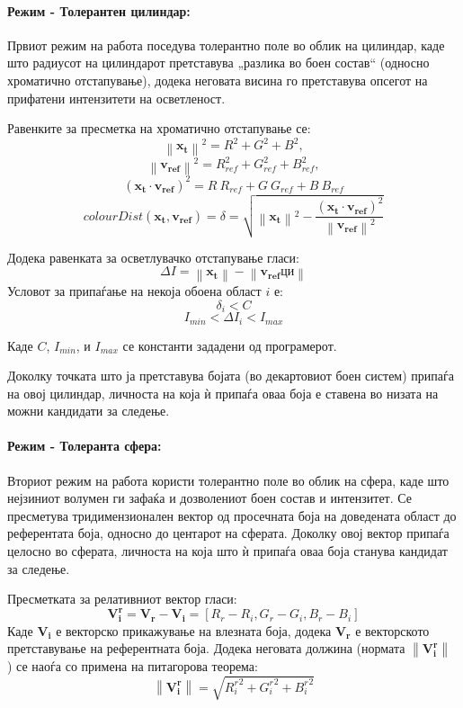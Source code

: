 \documentclass[12pt]{article}
\newcommand\norm[1]{\left\lVert#1\right\rVert}
\renewcommand{\vec}[1]{\mathbf{#1}}
\begin{document}
      \paragraph{Режим - Толерантен цилиндар:\\}

        Првиот режим на работа поседува толерантно поле во облик на цилиндар, каде што радиусот на цилиндарот претставува „разлика во боен состав“ (односно хроматично отстапување), додека неговата висина го претставува опсегот на прифатени интензитети на осветленост.

        Равенките за пресметка на хроматично отстапување се:
        $$  \norm{\vec{x_t}}^2 = R^2 + G^2 + B^2,$$
        $$  \norm{\vec{v_{ref}}}^2 = R_{ref}^2 + G_{ref}^2 + B_{ref}^2, $$
        $$    (\vec{x_t} \cdot \vec{v_{ref}})^2 = R\ R_{ref} + G\ G_{ref} + B\ B_{ref} $$
        $$    colourDist(\vec{x_t}, \vec{v_{ref}}) = \delta = \sqrt{\norm{\vec{x_t}}^2 - \frac{(\vec{x_t} \cdot \vec{v_{ref}})^2}{\norm{\vec{v_{ref}}}^2}} $$
        \bigbreak

        Додека равенката за осветлувачко отстапување гласи:
        $$ \Delta I = \norm{\vec{x_t}} - \norm{\vec{v_{ref}} ци} $$
        \bigbreak
        Условот за припаѓање на некоја обоена област $i$ е:
        $$ \delta_{i} < C $$
        $$ I_{min}< \Delta I_i < I_{max} $$

        Каде $C$, $I_{min}$, и $I_{max}$ се константи зададени од програмерот.

        Доколку точката што ја претставува бојата (во декартовиот боен систем) припаѓа на овој цилиндар, личноста на која ѝ припаѓа оваа боја е ставена во низата на можни кандидати за следење.

      \paragraph{Режим - Толеранта сфера:\\}

        Вториот режим на работа користи толерантно поле во облик на сфера, каде што нејзиниот волумен ги зафаќа и дозволениот боен состав и интензитет. Се пресметува тридимензионален вектор од просечната боја на доведената област до референтата боја, односно до центарот на сферата. Доколку овој вектор припаѓа целосно во сферата, личноста на која што ѝ припаѓа оваа боја станува кандидат за следење.

        Пресметката за релативниот вектор гласи:
        $$ \vec{V_i^r} = \vec{V_r} - \vec{V_i}= [R_r - R_i, G_r - G_i, B_r - B_i] $$
        Каде $\vec{V_i}$ е векторско прикажување на влезната боја, додека $\vec{V_r}$ е векторското претставување на референтната боја.
        Додека неговата должина (нормата $\norm{\vec{V_i^r}}$ ) се наоѓа со примена на питагорова теорема:
        $$ \norm{\vec{V_i^r}} = \sqrt{{R_i^r}^2 + {G_i^r}^2 + {B_i^r}^2} $$
\end{document}
